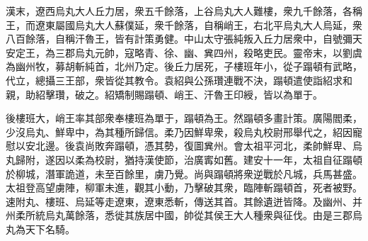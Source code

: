 \begin{pinyinscope}
 
 
 漢末，遼西烏丸大人丘力居，衆五千餘落，上谷烏丸大人難樓，衆九千餘落，各稱王，而遼東屬國烏丸大人蘇僕延，衆千餘落，自稱峭王，右北平烏丸大人烏延，衆八百餘落，自稱汗魯王，皆有計策勇健。中山太守張純叛入丘力居衆中，自號彌天安定王，為三郡烏丸元帥，寇略青、徐、幽、兾四州，殺略吏民。靈帝末，以劉虞為幽州牧，募胡斬純首，北州乃定。後丘力居死，子樓班年小，從子蹋頓有武略，代立，總攝三王部，衆皆從其教令。袁紹與公孫瓚連戰不決，蹋頓遣使詣紹求和親，助紹擊瓚，破之。紹矯制賜蹋頓、峭王、汗魯王印綬，皆以為單于。
 
 
 
 
後樓班大，峭王率其部衆奉樓班為單于，蹋頓為王。然蹋頓多畫計策。廣陽閻柔，少沒烏丸、鮮卑中，為其種所歸信。柔乃因鮮卑衆，殺烏丸校尉邢舉代之，紹因寵慰以安北邊。後袁尚敗奔蹋頓，憑其勢，復圖兾州。會太祖平河北，柔帥鮮卑、烏丸歸附，遂因以柔為校尉，猶持漢使節，治廣寗如舊。建安十一年，太祖自征蹋頓於柳城，潛軍詭道，未至百餘里，虜乃覺。尚與蹋頓將衆逆戰於凡城，兵馬甚盛。太祖登高望虜陣，柳軍未進，觀其小動，乃擊破其衆，臨陣斬蹋頓首，死者被野。速附丸、樓班、烏延等走遼東，遼東悉斬，傳送其首。其餘遺迸皆降。及幽州、并州柔所統烏丸萬餘落，悉徙其族居中國，帥從其侯王大人種衆與征伐。由是三郡烏丸為天下名騎。
 
 
\end{pinyinscope}